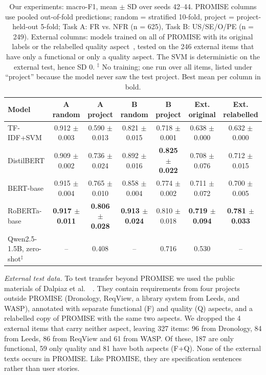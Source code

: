 \documentclass[conference,10pt,letterpaper]{IEEEtran}
\begin{document}
\begin{table}[!t]
\centering
\caption{Our experiments: macro-F1, mean $\pm$ SD over seeds 42–44. PROMISE columns use pooled out-of-fold predictions; random = stratified 10-fold, project = project-held-out 5-fold; Task A: FR vs. NFR (n = 625), Task B: US/SE/O/PE (n = 249). External columns: models trained on all of PROMISE with its original labels or the relabelled quality aspect~\cite{dalpiaz2019}, tested on the 246 external items that have only a functional or only a quality aspect. The SVM is deterministic on the external test, hence SD 0. $^{\ddagger}$ No training; one run over all items, listed under “project” because the model never saw the test project. Best mean per column in bold.}
\label{tab:res}
\footnotesize
\setlength{\tabcolsep}{3pt}
\renewcommand{\arraystretch}{1.12}
\begin{tabular}{@{}lcccccc@{}}
\toprule
\textbf{Model} & \textbf{A random} & \textbf{A project} & \textbf{B random} & \textbf{B project} & \textbf{Ext. original} & \textbf{Ext. relabelled} \\
\midrule
TF-IDF+SVM & 0.912 $\pm$ 0.003 & 0.590 $\pm$ 0.013 & 0.821 $\pm$ 0.015 & 0.718 $\pm$ 0.001 & 0.638 $\pm$ 0.000 & 0.632 $\pm$ 0.000 \\
DistilBERT & 0.909 $\pm$ 0.002 & 0.736 $\pm$ 0.024 & 0.892 $\pm$ 0.016 & \textbf{0.825 $\pm$ 0.022} & 0.708 $\pm$ 0.076 & 0.712 $\pm$ 0.015 \\
BERT-base & 0.915 $\pm$ 0.004 & 0.765 $\pm$ 0.010 & 0.858 $\pm$ 0.004 & 0.774 $\pm$ 0.002 & 0.711 $\pm$ 0.072 & 0.700 $\pm$ 0.005 \\
RoBERTa-base & \textbf{0.917 $\pm$ 0.011} & \textbf{0.806 $\pm$ 0.028} & \textbf{0.913 $\pm$ 0.024} & 0.810 $\pm$ 0.018 & \textbf{0.719 $\pm$ 0.094} & \textbf{0.781 $\pm$ 0.033} \\
Qwen2.5-1.5B, zero-shot$^{\ddagger}$ & – & 0.408 & – & 0.716 & 0.530 & – \\
\bottomrule
\end{tabular}
\end{table}

\emph{External test data.} To test transfer beyond PROMISE we used the public materials of Dalpiaz et al.~\cite{dalpiaz2019}~\cite{dalpiaz2019data}. They contain requirements from four projects outside PROMISE (Dronology, ReqView, a library system from Leeds, and WASP), annotated with separate functional (F) and quality (Q) aspects, and a relabelled copy of PROMISE with the same two aspects. We dropped the 4 external items that carry neither aspect, leaving 327 items: 96 from Dronology, 84 from Leeds, 86 from ReqView and 61 from WASP. Of these, 187 are only functional, 59 only quality and 81 have both aspects (F+Q). None of the external texts occurs in PROMISE. Like PROMISE, they are specification sentences rather than user stories.
\end{document}
